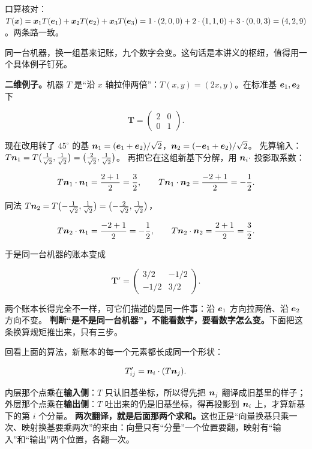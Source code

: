 \documentclass[11pt]{ctexart}
\newcommand{\ten}[1]{\mathbf{#1}}
\newcommand{\step}[1]{\par\smallskip\noindent{\color{violetdeep}\bfseries #1}\hspace{0.35em}}
\let\origsubhdr\subhdr
\renewcommand{\subhdr}[1]{\par\needspace{3\baselineskip}\origsubhdr{#1}}
\begin{document}
口算核对：$T(\boldsymbol{x})=\boldsymbol{x}_1T(\boldsymbol{e}_1)+\boldsymbol{x}_2T(\boldsymbol{e}_2)+\boldsymbol{x}_3T(\boldsymbol{e}_3)=1\cdot(2,0,0)+2\cdot(1,1,0)+3\cdot(0,0,3)=(4,2,9)$。两条路一致。


同一台机器，换一组基来记账，九个数字会变。这句话是本讲义的枢纽，值得用一个具体例子钉死。

\textbf{二维例子。}机器 $T$ 是“沿 $x$ 轴拉伸两倍”：$T(x,y)=(2x,y)$。在标准基 $\boldsymbol{e}_1,\boldsymbol{e}_2$ 下

\[
\ten T=\begin{pmatrix}2&0\\0&1\end{pmatrix}.
\]

现在改用转了 $45^\circ$ 的基 $\boldsymbol{n}_1=(\boldsymbol{e}_1+\boldsymbol{e}_2)/\sqrt2$，$\boldsymbol{n}_2=(-\boldsymbol{e}_1+\boldsymbol{e}_2)/\sqrt2$。
先算输入：$T\boldsymbol{n}_1=T\bigl(\tfrac{1}{\sqrt2},\tfrac{1}{\sqrt2}\bigr)=\bigl(\tfrac{2}{\sqrt2},\tfrac{1}{\sqrt2}\bigr)$。
再把它在这组新基下分解，用 $\boldsymbol{n}_i\cdot$ 投影取系数：

\[
T\boldsymbol{n}_1\cdot\boldsymbol{n}_1=\frac{2+1}{2}=\frac32,\qquad
T\boldsymbol{n}_1\cdot\boldsymbol{n}_2=\frac{-2+1}{2}=-\frac12 .
\]

同法 $T\boldsymbol{n}_2=T\bigl(-\tfrac{1}{\sqrt2},\tfrac{1}{\sqrt2}\bigr)=\bigl(-\tfrac{2}{\sqrt2},\tfrac{1}{\sqrt2}\bigr)$，

\[
T\boldsymbol{n}_2\cdot\boldsymbol{n}_1=\frac{-2+1}{2}=-\frac12,\qquad
T\boldsymbol{n}_2\cdot\boldsymbol{n}_2=\frac{2+1}{2}=\frac32 .
\]

于是同一台机器的账本变成

\[
\ten T'=\begin{pmatrix}3/2&-1/2\\-1/2&3/2\end{pmatrix}.
\]

两个账本长得完全不一样，可它们描述的是同一件事：沿 $\boldsymbol{e}_1$ 方向拉两倍、沿 $\boldsymbol{e}_2$ 方向不变。
\textbf{判断“是不是同一台机器”，不能看数字，要看数字怎么变。}下面把这条换算规矩推出来，只有三步。

\step{第一步：每个新分量都是两次点乘}
回看上面的算法，新账本的每一个元素都长成同一个形状：

\[
T'_{ij}=\boldsymbol{n}_i\cdot(T\boldsymbol{n}_j).
\]

内层那个点乘在\textbf{输入侧}：$T$ 只认旧基坐标，所以得先把 $\boldsymbol{n}_j$ 翻译成旧基里的样子；
外层那个点乘在\textbf{输出侧}：$T$ 吐出来的仍是旧基坐标，得再投影到 $\boldsymbol{n}_i$ 上，才算新基下的第 $i$ 个分量。
\textbf{两次翻译，就是后面那两个求和。}这也正是“向量换基只乘一次、映射换基要乘两次”的来由：向量只有“分量”一个位置要翻，映射有“输入”和“输出”两个位置，各翻一次。
\end{document}
